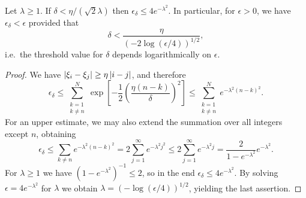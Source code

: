 \begin{proposition}
\label{prop:points-along-line-upper-bound}
    Let $\lambda \geq 1$. If $\delta < \eta / (\sqrt{2}\lambda)$ then $\epsilon_\delta \leq 4e^{-\lambda^2}$.  In particular, for $\epsilon > 0$, we have $\epsilon_\delta < \epsilon$ provided that 
    \begin{equation}
        \delta < \frac{\eta}{(-2\log(\epsilon/4))^{1/2}},
    \end{equation}
    i.e.\ the threshold value for $\delta$ depends logarithmically on $\epsilon$.
\end{proposition}
\begin{proof}
    We have $\left\lvert{\xi_i - \xi_j}\right\rvert \geq \eta\left\lvert{i-j}\right\rvert$, and therefore
    \begin{equation}
        \epsilon_\delta \leq \sum_{\substack{k =1\\ k\ne n}}^N \exp \left[ -\frac{1}{2} \left(\frac{\eta(n-k)}{\delta}\right)^2\right]
        \leq \sum_{\substack{k =1\\ k\ne n}}^N e^ {-{\lambda^2} (n-k)^2}.
    \end{equation}
    For an upper estimate, we may also extend the summation over all integers except $n$, obtaining 
    \begin{equation}
        \epsilon_\delta 
        \leq \sum_{k\ne n} e^ {-{\lambda^2} (n-k)^2}
        = 2\sum_{j=1}^\infty e^ {-{\lambda^2} j^2}
        \leq 2\sum_{j=1}^\infty e^ {-{\lambda^2} j}
        = \frac{2}{1-e^{-\lambda^2}} e^{-\lambda^2}.
    \end{equation}
    For $\lambda \geq 1$ we have $(1-e^{-\lambda^2})^{-1} \leq 2$, so in the end $\epsilon_\delta \leq 4e^{-\lambda^2}$. By solving $\epsilon = 4e^{-\lambda^2}$ for $\lambda$ we obtain $\lambda = (-\log(\epsilon/4))^{1/2}$, yielding the last assertion.
\end{proof}




































